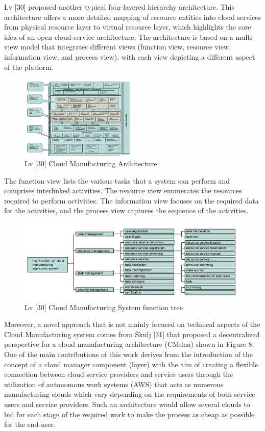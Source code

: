 Lv [30] proposed another typical four-layered hierarchy architecture. This architecture offers a more detailed mapping of resource entities into cloud services from physical resource layer to virtual resource layer, which highlights the core idea of an open cloud service architecture. The architecture is based on a multi-view model that integrates different views (function view, resource view, information view, and process view), with each view depicting a different aspect of the platform.


\begin{figure}[h]
    \centering
    \includegraphics[height=4cm, keepaspectratio]{images/lv-cmfg-architecture}
    \caption{Lv [30] Cloud Manufacturing Architecture}
    \label{fig:lv-cmfg-architecture}
\end{figure}

The function view lists the various tasks that a system can perform and comprises interlinked activities. The resource view enumerates the resources required to perform activities. The information view focuses on the required data for the activities, and the process view captures the sequence of the activities.

\begin{figure}[h]
    \centering
    \includegraphics[height=4cm, keepaspectratio]{images/lv-cmfg-function-tree}
    \caption{Lv [30] Cloud Manufacturing System function tree}
    \label{fig:lv-cmfg-function-tree}
\end{figure}


Moreover, a novel approach that is not mainly focused on technical aspects of the Cloud Manufacturing system comes from Škulj [31] that proposed a decentralized perspective for a cloud manufacturing architecture (CMdna) shown in Figure 8. One of the main contributions of this work derives from the introduction of the concept of a cloud manager component (layer) with the aim of creating a flexible connection between cloud service providers and service users through the utilization of autonomous work systems (AWS) that acts as numerous manufacturing clouds which vary depending on the requirements of both service users and service providers. Such an architecture would allow several clouds to bid for each stage of the required work to make the process as cheap as possible for the end-user.

